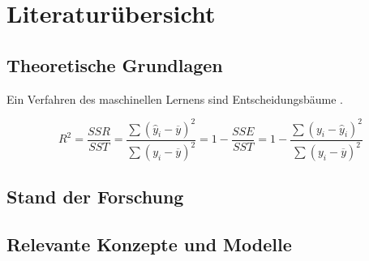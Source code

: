 \chapter{Literaturübersicht}

\section{Theoretische Grundlagen}

Ein Verfahren des maschinellen Lernens sind Entscheidungsbäume \autocite{knuth_2021}.

\lipsum[1]

\begin{equation}
  \mathit{R}^2=\frac{SSR}{SST}=
  \frac{\sum\nolimits \left(\hat{y}_i-\overline{y}\right)^2}{\sum\nolimits\left(y_i-\overline{y}\right)^2}=1-\frac{SSE}{SST}=1-\frac{\sum\nolimits\left(y_i-\hat{y}_i\right)^2}{\sum\nolimits \left(y_i-\overline{y}\right)^2}
\end{equation}

\lipsum[2]

\section{Stand der Forschung}

\lipsum[2]

\section{Relevante Konzepte und Modelle}

\lipsum[3-5]

